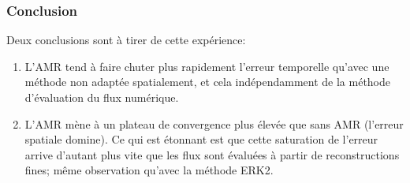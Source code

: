     \subsubsection{Conclusion}
    Deux conclusions sont à tirer de cette expérience:
    \begin{enumerate}
        \item L'AMR tend à faire chuter plus rapidement l'erreur temporelle qu'avec une méthode non adaptée spatialement, et cela indépendamment de la méthode d'évaluation du flux numérique.
        \item L'AMR mène à un plateau de convergence plus élevée que sans AMR (l'erreur spatiale domine). Ce qui est étonnant est que cette saturation de l'erreur arrive d'autant plus vite que les flux sont évaluées à partir de reconstructions fines; même observation qu'avec la méthode ERK2.
    \end{enumerate}